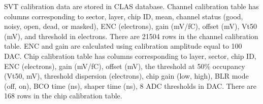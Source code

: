 SVT calibration data are stored in CLAS database. Channel calibration table has columns corresponding to sector, layer, chip ID, mean, channel status (good, noisy, open, dead, or masked), ENC (electrons), gain (mV/fC), offset (mV), Vt50 (mV), and threshold in electrons. There are 21504 rows in the channel calibration table. ENC and gain are calculated using calibration amplitude equal to 100 DAC.
Chip calibration table has columns corresponding to layer, sector, chip ID, ENC (electrons), gain (mV/fC), offset (mV), the threshold at 50$\%$ occupancy (Vt50, mV), threshold dispersion (electrons), chip gain (low, high), BLR mode (off, on), BCO time (ns), shaper time (ns), 8 ADC thresholds in DAC. There are 168 rows in the chip calibration table. 

